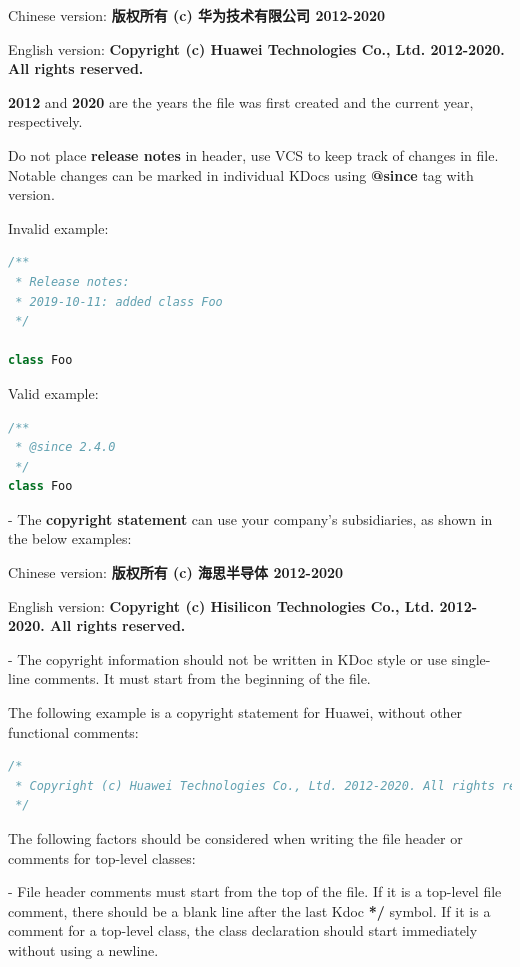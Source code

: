 Chinese version: \textbf{版权所有 (c) 华为技术有限公司 2012-2020} \

English version: \textbf{Copyright (c) Huawei Technologies Co., Ltd. 2012-2020. All rights reserved.}

\textbf{2012} and \textbf{2020} are the years the file was first created and the current year, respectively.



Do not place \textbf{release notes} in header, use VCS to keep track of changes in file. Notable changes can be marked in individual KDocs using \textbf{@since} tag with version.



Invalid example:

\begin{lstlisting}[language=Kotlin]
/**
 * Release notes:
 * 2019-10-11: added class Foo
 */

class Foo
\end{lstlisting}


Valid example:

\begin{lstlisting}[language=Kotlin]
/**
 * @since 2.4.0
 */
class Foo
\end{lstlisting}


- The \textbf{copyright statement} can use your company's subsidiaries, as shown in the below examples: \

Chinese version: \textbf{版权所有 (c) 海思半导体 2012-2020} \

English version: \textbf{Copyright (c) Hisilicon Technologies Co., Ltd. 2012-2020. All rights reserved.} 



- The copyright information should not be written in KDoc style or use single-line comments. It must start from the beginning of the file.

The following example is a copyright statement for Huawei, without other functional comments:



\begin{lstlisting}[language=Kotlin]
/*
 * Copyright (c) Huawei Technologies Co., Ltd. 2012-2020. All rights reserved.
 */
\end{lstlisting}


The following factors should be considered when writing the file header or comments for top-level classes:

- File header comments must start from the top of the file. If it is a top-level file comment, there should be a blank line after the last Kdoc \textbf{*/} symbol. If it is a comment for a top-level class, the class declaration should start immediately without using a newline.


